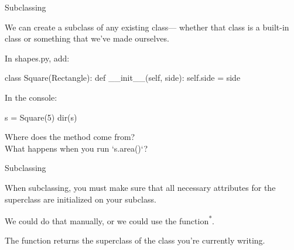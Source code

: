 \documentclass[aspectratio=169] {beamer}
\begin{document}
\begin{frame}[fragile]{Subclassing}

  We can create a subclass of any existing class--- whether that class is a built-in class or something that we've made ourselves.

  \medskip \pause

  In shapes.py, add:
  \begin{pythoncode}
    class Square(Rectangle):
        def __init__(self, side):
            self.side = side
  \end{pythoncode}

  \medskip \pause

  In the console:
  \begin{pythoncode}
    s = Square(5)
    dir(s)
  \end{pythoncode}

  \pause

  Where does the  method come from? \\
  What happens when you run \inlineverb`s.area()`?

\end{frame}

\begin{frame}[fragile]{Subclassing}

  When subclassing, you must make sure that all necessary attributes for the superclass are initialized on your subclass.

  \medskip

  We could do that manually, or we could use the  function\textsuperscript{*}. 

  \medskip

  The  function returns the superclass of the class you're currently writing.

\end{frame}
\end{document}
